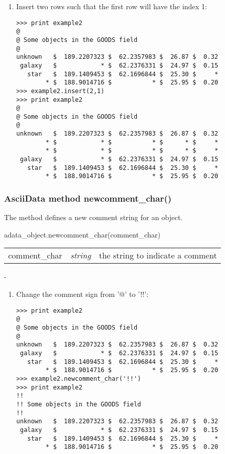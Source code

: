 \begin{enumerate}
\item Insert two rows such that the first row will have the index 1:
\begin{small}
\begin{verbatim}
>>> print example2
@
@ Some objects in the GOODS field
@
unknown   $  189.2207323 $  62.2357983 $  26.87 $  0.32
 galaxy   $            * $  62.2376331 $  24.97 $  0.15
   star   $  189.1409453 $  62.1696844 $  25.30 $     *
        * $  188.9014716 $           * $  25.95 $  0.20
>>> example2.insert(2,1)
>>> print example2
@
@ Some objects in the GOODS field
@
unknown   $  189.2207323 $  62.2357983 $  26.87 $  0.32
        * $            * $           * $      * $     *
        * $            * $           * $      * $     *
 galaxy   $            * $  62.2376331 $  24.97 $  0.15
   star   $  189.1409453 $  62.1696844 $  25.30 $     *
        * $  188.9014716 $           * $  25.95 $  0.20
\end{verbatim}
\end{small}
\end{enumerate}

\subsubsection{AsciiData method newcomment\_char()}
\label{adm_newcomment}
The method defines a new comment string for an \ad object.

adata\_object.newcomment\_char(comment\_char)

\begin{tabular}{lcl}
comment\_char &{\it string}& the string to indicate a comment\\
\end{tabular}

-

\begin{enumerate}
\item Change the comment sign from '@' to '!!':
\begin{small}
\begin{verbatim}
>>> print example2
@
@ Some objects in the GOODS field
@
unknown   $  189.2207323 $  62.2357983 $  26.87 $  0.32
 galaxy   $            * $  62.2376331 $  24.97 $  0.15
   star   $  189.1409453 $  62.1696844 $  25.30 $     *
        * $  188.9014716 $           * $  25.95 $  0.20
>>> example2.newcomment_char('!!')
>>> print example2
!!
!! Some objects in the GOODS field
!!
unknown   $  189.2207323 $  62.2357983 $  26.87 $  0.32
 galaxy   $            * $  62.2376331 $  24.97 $  0.15
   star   $  189.1409453 $  62.1696844 $  25.30 $     *
        * $  188.9014716 $           * $  25.95 $  0.20
\end{verbatim}
\end{small}
\end{enumerate}

